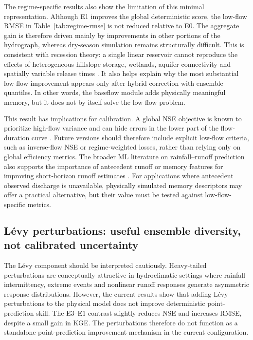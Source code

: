 \documentclass[a4paper,fleqn]{cas-sc}
\begin{document}
The regime-specific results also show the limitation of this minimal
representation. Although E1 improves the global deterministic score, the
low-flow RMSE in Table~\ref{tab:regime-rmse} is not reduced relative to
E0. The aggregate gain is therefore driven mainly by improvements in
other portions of the hydrograph, whereas dry-season simulation remains
structurally difficult. This is consistent with recession theory: a
single linear reservoir cannot reproduce the effects of heterogeneous
hillslope storage, wetlands, aquifer connectivity and spatially variable
release times \citep{harman2009power,van2013influence}. It also helps
explain why the most substantial low-flow improvement appears only after
hybrid correction with ensemble quantiles. In other words, the baseflow
module adds physically meaningful memory, but it does not by itself
solve the low-flow problem.

This result has implications for calibration. A global NSE objective is
known to prioritize high-flow variance and can hide errors in the lower
part of the flow-duration curve \citep{pushpalatha2012review}. Future
versions should therefore include explicit low-flow criteria, such as
inverse-flow NSE or regime-weighted losses, rather than relying only on
global efficiency metrics. The broader ML literature on rainfall--runoff
prediction also supports the importance of antecedent runoff or memory
features for improving short-horizon runoff estimates
\citep{adnan2021comparison,okkan2021embedding}. For applications where
antecedent observed discharge is unavailable, physically simulated
memory descriptors may offer a practical alternative, but their value
must be tested against low-flow-specific metrics.

\subsection{L\'{e}vy perturbations: useful ensemble diversity, not calibrated uncertainty}
\label{subsec:discussion-levy}

The L\'{e}vy component should be interpreted cautiously. Heavy-tailed
perturbations are conceptually attractive in hydroclimatic settings
where rainfall intermittency, extreme events and nonlinear runoff
responses generate asymmetric response distributions. However, the
current results show that adding L\'{e}vy perturbations to the physical
model does not improve deterministic point-prediction skill. The
E3--E1 contrast slightly reduces NSE and increases RMSE, despite a
small gain in KGE. The perturbations therefore do not function as a
standalone point-prediction improvement mechanism in the current
configuration.
\end{document}
